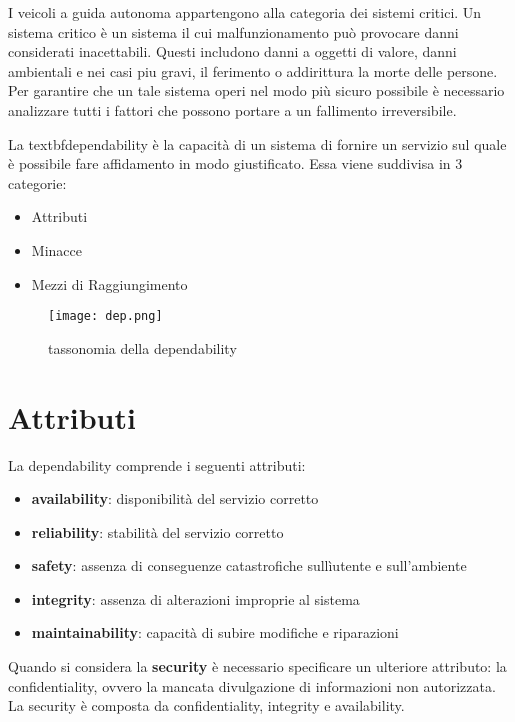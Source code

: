\cite{tax}
I veicoli a guida autonoma appartengono alla categoria dei sistemi critici. Un sistema critico è un sistema il cui malfunzionamento può provocare danni
considerati inacettabili. Questi includono danni a oggetti di valore, danni ambientali e nei casi piu gravi, il ferimento o addirittura la morte delle persone.
Per garantire che un tale sistema operi nel modo più sicuro possibile è necessario analizzare tutti i fattori che possono portare a  un fallimento irreversibile.

La textbf{dependability} è la capacità di un sistema di fornire un servizio sul quale è possibile fare affidamento in modo giustificato.
Essa viene suddivisa in 3 categorie:
\begin{itemize}
    \item Attributi
    \item Minacce
    \item Mezzi di Raggiungimento
\end{itemize}
\begin{figure}[h]
    \texttt{[image: dep.png]}
    \caption{tassonomia  della dependability\cite{dep}}
    \label{fig:dep}
\end{figure}
\section{Attributi}
La dependability comprende i seguenti attributi:
\begin{itemize}
    \item \textbf{availability}: disponibilità del servizio corretto
    \item \textbf{reliability}: stabilità del servizio corretto
    \item \textbf{safety}: assenza di conseguenze catastrofiche sullìutente e sull'ambiente
    \item \textbf{integrity}: assenza di alterazioni improprie al sistema
    \item \textbf{maintainability}: capacità di subire modifiche e riparazioni
\end{itemize}
Quando si considera la \textbf{security} è necessario specificare un ulteriore attributo: la confidentiality, ovvero la mancata divulgazione di informazioni non 
autorizzata. La security è composta da confidentiality, integrity e availability.
